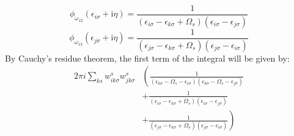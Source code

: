 \documentclass[12pt]{article}
\begin{document}
\begin{equation}
\boxed{\phi_{\omega_{12}}(\epsilon_{i \sigma} + \mathrm{i} \eta) = \frac{1}{(\epsilon_{i \sigma} -\epsilon_{k \sigma}+\Omega_s)(\epsilon_{i \sigma} -\epsilon_{j \sigma})}}
\end{equation}
\begin{equation}
\boxed{\phi_{\omega_{13}}(\epsilon_{j \sigma} + \mathrm{i} \eta) = \frac{1}{(\epsilon_{j \sigma} -\epsilon_{k \sigma}+\Omega_s)(\epsilon_{j \sigma} -\epsilon_{i \sigma})}}
\end{equation}
By Cauchy's residue theorem,  the first term of the integral will be given by:
\begin{equation}
\begin{aligned}
2\pi i \sum_{ks} w_{i k \sigma}^s w_{j k \sigma}^s & \left( \frac{1}{(\epsilon_{k \sigma} - \Omega_s -\epsilon_{i \sigma})(\epsilon_{k \sigma} - \Omega_s -\epsilon_{j \sigma})} \right. \\
& \left. + \frac{1}{(\epsilon_{i \sigma} -\epsilon_{k \sigma}+\Omega_s)(\epsilon_{i \sigma} -\epsilon_{j \sigma})} \right. \\
& \left. + \frac{1}{(\epsilon_{j \sigma} -\epsilon_{k \sigma}+\Omega_s)(\epsilon_{j \sigma} -\epsilon_{i \sigma})} \right)
\end{aligned}
\end{equation}
\end{document}
